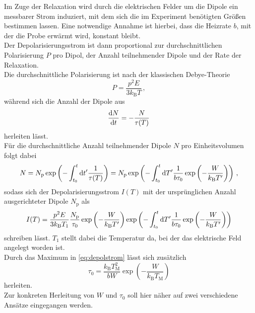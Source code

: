 Im Zuge der Relaxation wird durch die elektrischen Felder um die Dipole ein messbarer Strom induziert, mit dem sich die im Experiment benötigten Größen bestimmen lassen.
Eine notwendige Annahme ist hierbei, dass die Heizrate $b$, mit der die Probe erwärmt wird, konstant bleibt. \\
Der Depolarisierungsstrom ist dann proportional zur durchschnittlichen Polarisierung $P$ pro Dipol, der Anzahl teilnehmender Dipole und der Rate der Relaxation. \\
Die durchschnittliche Polarisierung ist nach der klassischen Debye-Theorie
\begin{equation}
    P = \frac{p^2 E}{3 k_\text{B} T} \,,
    \label{eq:durchPola}
\end{equation}
während sich die Anzahl der Dipole aus
\begin{equation}
    \frac{\mathrm{d} N}{\mathrm{d} t} = - \frac{N}{\tau(T)}
    \label{eq:AnzahlDipole}
\end{equation}
herleiten lässt. \\
Für die durchschnittliche Anzahl teilnehmender Dipole $N$ pro Einheitsvolumen folgt dabei
\begin{equation}
    N = N_\text{p} \exp \left(- \int^t_{t_0} \mathrm{d} t' \frac{1}{\tau(T)}\right) =  N_\text{p} \exp \left(- \int^t_{t_0} \mathrm{d} T' \frac{1}{b \tau_0} \exp \left(-\frac{W}{k_\text{B} T'} \right)\right) \,,
    \label{eq:N}
\end{equation}
sodass sich der Depolarisierungsstrom $I(T)$ mit der ursprünglichen Anzahl ausgerichteter Dipole $N_\text{p}$ als 
\begin{equation}
    I(T) = \frac{p^2 E}{3 k_\text{B} T_1} \frac{N_\text{p}}{\tau_0}  \exp \left(-\frac{W}{k_\text{B} T'} \right) \exp \left(- \int^t_{t_0} \mathrm{d} T' \frac{1}{b \tau_0}  \exp \left(-\frac{W}{k_\text{B} T'} \right) \right)
    \label{eq:depolstrom}
\end{equation}
schreiben lässt.
$T_1$ stellt dabei die Temperatur da, bei der das elektrische Feld angelegt worden ist. \\

Durch das Maximum in \eqref{eq:depolstrom} lässt sich zusätzlich
\begin{equation*}
    \tau_0 = \frac{k_\text{B} T^2_\text{M}}{b W} \exp \left(- \frac{W}{k_\text{B} T_\text{M}}\right)
\end{equation*}
herleiten. \\

Zur konkreten Herleitung von $W$ und $\tau_0$ soll hier näher auf zwei verschiedene Ansätze eingegangen werden.

